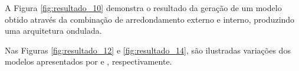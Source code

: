 \newpage

A Figura \ref{fig:resultado_10} demonstra o resultado da geração de um modelo obtido através da combinação de arredondamento externo e interno, produzindo uma arquitetura ondulada.

\begin{figure}[h!]
	\centering
	\captionsetup{width=15cm}
	{}	
\end{figure}

Nas Figuras \ref{fig:resultado_12} e \ref{fig:resultado_14}, são ilustradas variações dos modelos apresentados por  e , respectivamente.

\begin{figure}[h!]
	\centering
	\captionsetup{width=15cm}
	{}	
\end{figure}

